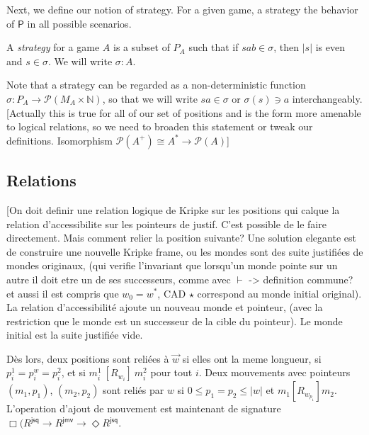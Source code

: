 \documentclass[acmsmall,anonymous]{acmart}
\newcommand{\kw}[1]{\ensuremath{ \textsf{#1} }}
\newcommand{\ifr}[1]{\ [{#1}]\ }
\begin{document}
Next,
we define our notion of strategy.
For a given game,
a strategy the behavior of $\kw{P}$
in all possible scenarios.

\begin{definition}[Strategy]
A \emph{strategy} for a game $A$
is a subset of $P_A$ such that if $s a b \in \sigma$,
then $|s|$ is even and $s \in \sigma$.
We will write $\sigma : A$.
\end{definition}

Note that a strategy can be regarded as
a non-deterministic function
$\sigma : P_A \rightarrow \mathcal{P}(M_A \times \mathbb{N})$,
so that we will write $sa \in \sigma$ or $\sigma(s) \ni a$
interchangeably.
[Actually this is true for all of our set of positions
and is the form more amenable to logical relations,
so we need to broaden this statement or
tweak our definitions.
Isomorphism $\mathcal{P}(A^+) \cong A^* \rightarrow \mathcal{P}(A)$]


\subsection{Relations} %

[On doit definir une relation logique de Kripke sur les positions
qui calque la relation d'accessibilite sur les pointeurs de justif.
C'est possible de le faire directement.
Mais comment relier la position suivante?
Une solution elegante est de
construire une nouvelle Kripke frame,
ou les mondes sont des suite justifi\'ees de mondes originaux,
(qui verifie l'invariant que lorsqu'un monde pointe sur un autre
il doit etre un de ses successeurs,
comme avec $\vdash$ -> definition commune?
et aussi il est compris que $w_0 = w^*$,
CAD $\star$ correspond au monde initial original).
La relation d'accessibilit\'e ajoute un nouveau monde et pointeur,
(avec la restriction que le monde est un successeur
de la cible du pointeur).
Le monde initial est la suite justifi\'ee vide.

D\`es lors,
deux positions sont reli\'ees \`a $\vec{w}$
si elles ont la meme longueur,
si $p^1_i = p^w_i = p^2_i$,
et si $m^1_i \ifr{R_{w_i}} m^2_i$
pour tout $i$.
Deux mouvements avec pointeurs $(m_1, p_1)$, $(m_2, p_2)$
sont reli\'es par $w$ si
$0 \le p_1 = p_2 \le |w|$ et
$m_1 [R_{w_{p_1}}] m_2$.
L'operation d'ajout de mouvement
est maintenant de signature $\Box (R^\kw{jsq} \rightarrow R^\kw{jmv} \rightarrow \Diamond R^\kw{jsq}$.
\end{document}
